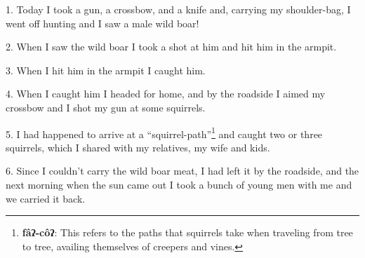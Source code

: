 \setcounter{footnote}{0}

1. Today I took a gun, a crossbow, and a knife and, carrying my shoulder-bag, I
went off hunting and I saw a male wild boar!

2. When I saw the wild boar I took a shot at him and hit him in the armpit.

3. When I hit him in the armpit I caught him.

4. When I caught him I headed for home, and by the roadside I aimed my crossbow
and I shot my gun at some squirrels.

5. I had happened to arrive at a ``squirrel-path''\footnote{\textbf{fâʔ-côʔ}: This refers to the paths that squirrels take when traveling from tree to tree, availing themselves of creepers and vines.} and caught two or three squirrels,
which I shared with my relatives, my wife and kids.

6. Since I couldn't carry the wild boar meat, I had left it by the roadside, and
the next morning when the sun came out I took a bunch of young men with me and
we carried it back.

